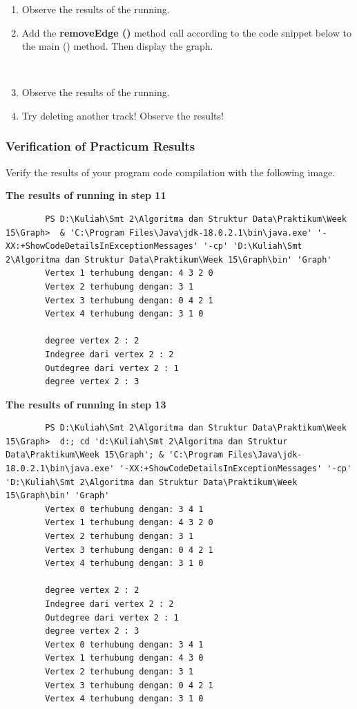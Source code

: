 \documentclass[12pt,titlepage]{article}
\begin{document}
\begin{enumerate}
\begin{verbatim}
    \end{verbatim}
    \item Observe the results of the running.
    \item Add the \textbf{removeEdge ()} method call according to the code snippet below to the main () method. Then display the graph.
    \begin{verbatim}
        
    \end{verbatim}
    \item Observe the results of the running.
    \item Try deleting another track! Observe the results!
\end{enumerate}

\subsubsection{Verification of Practicum Results}
Verify the results of your program code compilation with the following image.
\begin{center}
    \textbf{The results of running in step 11}
    \begin{verbatim}
        PS D:\Kuliah\Smt 2\Algoritma dan Struktur Data\Praktikum\Week 15\Graph>  & 'C:\Program Files\Java\jdk-18.0.2.1\bin\java.exe' '-XX:+ShowCodeDetailsInExceptionMessages' '-cp' 'D:\Kuliah\Smt 2\Algoritma dan Struktur Data\Praktikum\Week 15\Graph\bin' 'Graph'
        Vertex 1 terhubung dengan: 4 3 2 0 
        Vertex 2 terhubung dengan: 3 1 
        Vertex 3 terhubung dengan: 0 4 2 1 
        Vertex 4 terhubung dengan: 3 1 0 

        degree vertex 2 : 2
        Indegree dari vertex 2 : 2
        Outdegree dari vertex 2 : 1
        degree vertex 2 : 3
    \end{verbatim}

    \textbf{The results of running in step 13}
    \begin{verbatim}
        PS D:\Kuliah\Smt 2\Algoritma dan Struktur Data\Praktikum\Week 15\Graph>  d:; cd 'd:\Kuliah\Smt 2\Algoritma dan Struktur Data\Praktikum\Week 15\Graph'; & 'C:\Program Files\Java\jdk-18.0.2.1\bin\java.exe' '-XX:+ShowCodeDetailsInExceptionMessages' '-cp' 'D:\Kuliah\Smt 2\Algoritma dan Struktur Data\Praktikum\Week 15\Graph\bin' 'Graph'      
        Vertex 0 terhubung dengan: 3 4 1 
        Vertex 1 terhubung dengan: 4 3 2 0
        Vertex 2 terhubung dengan: 3 1
        Vertex 3 terhubung dengan: 0 4 2 1
        Vertex 4 terhubung dengan: 3 1 0

        degree vertex 2 : 2
        Indegree dari vertex 2 : 2
        Outdegree dari vertex 2 : 1
        degree vertex 2 : 3
        Vertex 0 terhubung dengan: 3 4 1
        Vertex 1 terhubung dengan: 4 3 0
        Vertex 2 terhubung dengan: 3 1
        Vertex 3 terhubung dengan: 0 4 2 1
        Vertex 4 terhubung dengan: 3 1 0
    \end{verbatim}

\end{center}
\end{document}
